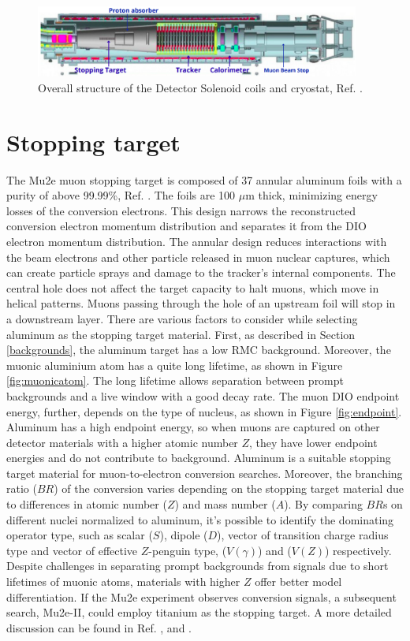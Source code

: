 \begin{figure}[!h]
\centering
\includegraphics[width =0.95\textwidth]{images/chapter2/Screenshot_20240306_225639.png}
\caption{Overall structure of the Detector Solenoid coils and cryostat, Ref. \cite{bobbb}.}
\label{fig:DS}
\end{figure}
\section{Stopping target}
The Mu2e muon stopping target is composed of 37 annular aluminum foils  with a purity of above 99.99\%, Ref. \cite{bobbb}. The foils are 100 $\mu$m thick, minimizing energy losses of the conversion electrons. This design narrows the reconstructed conversion electron momentum distribution and separates it from the DIO electron momentum distribution. The annular design reduces interactions with the beam electrons and other particle released in muon nuclear captures, which can create particle sprays and damage to the tracker's internal components. The central hole does not affect the target capacity to halt muons, which move in helical patterns. Muons passing through the hole of an upstream foil will stop in a downstream layer. There are various factors to consider while selecting aluminum as the stopping target material. First, as described in Section \ref{backgrounds}, the aluminum target has a low RMC background. Moreover, the muonic aluminium atom has a quite long lifetime, as shown in Figure \ref{fig:muonicatom}. The long lifetime allows separation between prompt backgrounds and a live window with a good decay rate. The muon DIO endpoint energy, further, depends on the type of nucleus, as shown in Figure \ref{fig:endpoint}. Aluminum has a high endpoint energy, so when muons are captured on other detector materials with a higher atomic number $Z$, they have lower endpoint energies and do not contribute to background. Aluminum is a suitable stopping target material for muon-to-electron conversion searches.
Moreover, the branching ratio ($BR$) of the conversion varies depending on the stopping target material due to differences in atomic number ($Z$) and mass number ($A$). By comparing $BR$s on different nuclei normalized to aluminum, it's possible to identify the dominating operator type, such as scalar ($S$), dipole ($D$), vector of transition charge radius type and vector of effective $Z$-penguin type, ($V(\gamma)$) and ($V(Z)$) respectively. Despite challenges in separating prompt backgrounds from signals due to short lifetimes of muonic atoms, materials with higher $Z$ offer better model differentiation. If the Mu2e experiment observes conversion signals, a subsequent search, Mu2e-II, could employ titanium as the stopping target. A more detailed discussion can be found in Ref. \cite{PhysRevD.80.013002}, \cite{PhysRevD.76.059902} and \cite{abusalma2018expression}.
